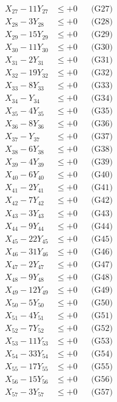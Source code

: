 \documentclass[a4paper,10pt]{article}
\begin{document}
{\begin{align}
X_{27} - 11Y_{27} &\leq +0 && \text{(G27)} \\
X_{28} - 3Y_{28} &\leq +0 && \text{(G28)} \\
X_{29} - 15Y_{29} &\leq +0 && \text{(G29)} \\
X_{30} - 11Y_{30} &\leq +0 && \text{(G30)} \\
X_{31} - 2Y_{31} &\leq +0 && \text{(G31)} \\
X_{32} - 19Y_{32} &\leq +0 && \text{(G32)} \\
X_{33} - 8Y_{33} &\leq +0 && \text{(G33)} \\
\allowbreak
X_{34} - Y_{34} &\leq +0 && \text{(G34)} \\
X_{35} - 4Y_{35} &\leq +0 && \text{(G35)} \\
X_{36} - 8Y_{36} &\leq +0 && \text{(G36)} \\
X_{37} - Y_{37} &\leq +0 && \text{(G37)} \\
X_{38} - 6Y_{38} &\leq +0 && \text{(G38)} \\
X_{39} - 4Y_{39} &\leq +0 && \text{(G39)} \\
X_{40} - 6Y_{40} &\leq +0 && \text{(G40)} \\
X_{41} - 2Y_{41} &\leq +0 && \text{(G41)} \\
X_{42} - 7Y_{42} &\leq +0 && \text{(G42)} \\
X_{43} - 3Y_{43} &\leq +0 && \text{(G43)} \\
\allowbreak
X_{44} - 9Y_{44} &\leq +0 && \text{(G44)} \\
X_{45} - 22Y_{45} &\leq +0 && \text{(G45)} \\
X_{46} - 31Y_{46} &\leq +0 && \text{(G46)} \\
X_{47} - 2Y_{47} &\leq +0 && \text{(G47)} \\
X_{48} - 9Y_{48} &\leq +0 && \text{(G48)} \\
X_{49} - 12Y_{49} &\leq +0 && \text{(G49)} \\
X_{50} - 5Y_{50} &\leq +0 && \text{(G50)} \\
X_{51} - 4Y_{51} &\leq +0 && \text{(G51)} \\
X_{52} - 7Y_{52} &\leq +0 && \text{(G52)} \\
X_{53} - 11Y_{53} &\leq +0 && \text{(G53)} \\
\allowbreak
X_{54} - 33Y_{54} &\leq +0 && \text{(G54)} \\
X_{55} - 17Y_{55} &\leq +0 && \text{(G55)} \\
X_{56} - 15Y_{56} &\leq +0 && \text{(G56)} \\
X_{57} - 3Y_{57} &\leq +0 && \text{(G57)} \\

\end{align}}
\end{document}
